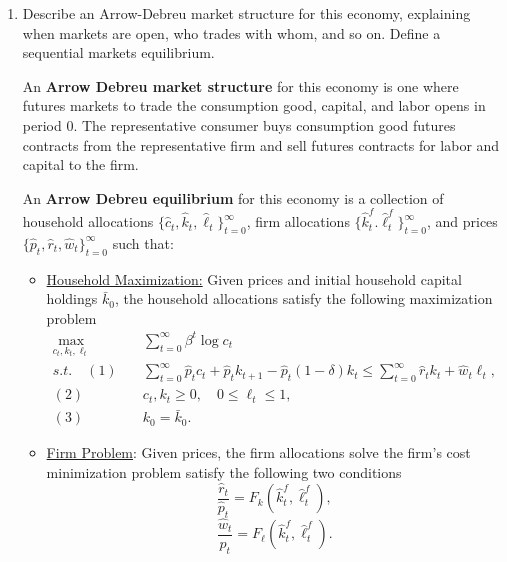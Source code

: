\documentclass[11pt,english]{article}
\begin{document}
\begin{enumerate}[label=(\alph*)]
    \item Describe an Arrow-Debreu market structure for this economy, explaining when markets are open, who trades with whom, and so on. Define a sequential markets equilibrium.
\begin{solution}
An \textbf{Arrow Debreu market structure} for this economy is one where futures markets to trade the consumption good, capital, and labor opens in period $0$. The representative consumer buys consumption good futures contracts from the representative firm and sell futures contracts for labor and capital to the firm.

An \textbf{Arrow Debreu equilibrium} for this economy is a collection of household allocations $\{\hat{c}_t, \hat{k}_{t}, \hat{\ell}_t\}_{t=0}^\infty$, firm allocations $\{\hat{k}_t^f. \hat{\ell}_t^f\}_{t=0}^\infty$, and prices $\{\hat{p}_t, \hat{r}_t, \hat{w}_t\}_{t=0}^\infty$ such that:
\begin{itemize}
\item \underline{Household Maximization:} Given prices and initial household capital holdings $\bar{k}_0$, the household allocations satisfy the following maximization problem
\begin{align*}
\max_{c_t,k_t, \ell_t}&\quad \sum_{t=0}^\infty \beta^t \log c_t\\
s.t.\quad (1)&\quad \sum_{t=0}^\infty \hat{p}_t c_t + \hat{p}_t k_{t+1} - \hat{p}_t(1 - \delta) k_t \leq \sum_{t=0}^\infty \hat{r}_tk_t + \hat{w}_t \ell_t,\\
(2)&\quad c_t,k_t \geq 0,\quad 0 \leq \ell_t \leq 1,\\
(3)&\quad k_0 = \bar{k}_0.
\end{align*}

\item \underline{Firm Problem}: Given prices, the firm allocations solve the firm's cost minimization problem satisfy the following two conditions
$$\frac{\hat{r}_t}{\hat{p}_t} = F_k(\hat{k}_t^f, \hat{\ell}_t^f),$$
$$\frac{\hat{w}_t}{\hat{p}_t} = F_\ell(\hat{k}_t^f, \hat{\ell}_t^f).$$


\end{itemize}
\end{solution}
\end{enumerate}
\end{document}
